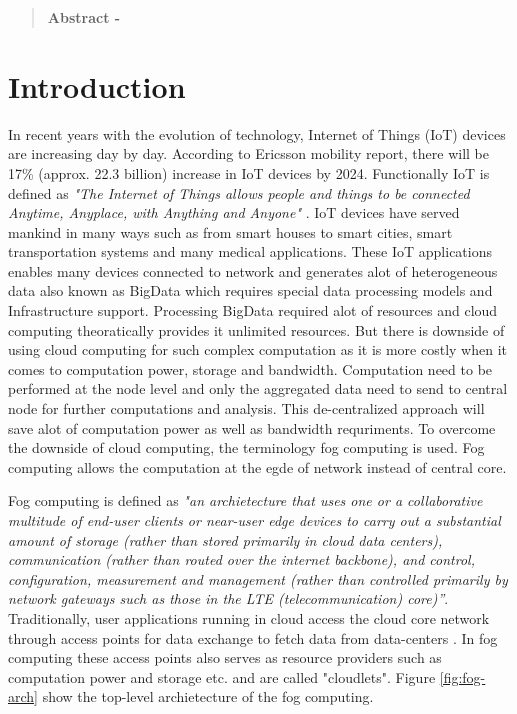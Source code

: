 %
%


\begin{abstract}
\textbf{Abstract - }
\end{abstract}


\section{Introduction}
\label{sec:introduction}
In recent years with the evolution of technology, Internet of Things (IoT) devices are increasing day by day. According to Ericsson mobility report\cite{}, there will be 17\% (approx. 22.3 billion) increase in IoT devices by 2024. Functionally IoT is defined as \emph{"The Internet of Things allows people and things to be connected Anytime, Anyplace, with Anything and Anyone"} \cite{European commission 2008}. IoT devices have served mankind in many ways such as from smart houses to smart cities, smart transportation systems and many medical applications. These IoT applications enables many devices connected to network and generates alot of heterogeneous data also known as BigData which requires special data processing models and Infrastructure support. Processing BigData required alot of resources and cloud computing theoratically provides it unlimited resources\cite{fog-comp-survey}. But there is downside of using cloud computing for such complex computation as it is more costly when it comes to computation power, storage and bandwidth. Computation need to be performed at the node level and only the aggregated data need to send to central node for further computations and analysis. This de-centralized approach will save alot of computation power as well as bandwidth requriments\cite{fog-comp-survey}. To overcome the downside of cloud computing, the terminology fog computing is used. Fog computing allows the computation at the egde of network instead of central core. \par
Fog computing is defined as \emph{"an archietecture that uses one or a collaborative multitude of end-user clients or near-user edge devices to carry out a substantial amount of storage (rather than stored primarily in cloud data centers), communication (rather than routed over the internet backbone), and control, configuration, measurement and management (rather than controlled primarily by network gateways such as those in the LTE (telecommunication) core)”}\cite{Chiang 2015; Aazam and Huh 2014}. Traditionally, user applications running in cloud access the cloud core network through access points for data exchange to fetch data from data-centers \cite{Bittencourt2017}. In fog computing these access points also serves as resource providers such as computation power and storage etc. and are called "cloudlets"\cite{Bittencourt2017}. Figure \ref{fig:fog-arch} show the top-level archietecture of the fog computing. \par
